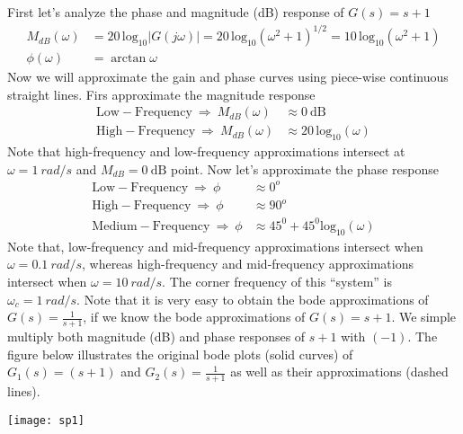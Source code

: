 \documentclass[twoside]{article}
\begin{document}
First let's analyze the phase and magnitude (dB) response of $G(s) = s + 1$
%
\begin{align*}
  M_{dB} (\omega) &= 20 \, \mathrm{log}_{10} | G( j \omega) | = 20 \, \mathrm{log}_{10} \left( \omega^2 + 1 \right)^{1/2} = 10 \, \mathrm{log}_{10} \left( \omega^2 + 1 \right)
  \\
  \phi(\omega) &= \arctan \omega                                    
\end{align*}
%
Now we will approximate the gain and phase curves using piece-wise continuous straight lines. 
Firs approximate the magnitude response
%
\begin{align*}
  \mathrm{Low-Frequency} \ \Rightarrow \ M_{dB}(\omega)  &\approx 0 \
                                                   \mathrm{dB} \\
  \mathrm{High-Frequency} \ \Rightarrow \ M_{dB}(\omega)  &\approx 20 \,
                                                    \mathrm{log}_{10} ( \omega )
\end{align*}
%
Note that high-frequency and low-frequency approximations intersect at
$\omega = 1 \ rad/s$ and $M_{dB} = 0 \ \mathrm{dB}$ point. Now 
let's approximate the phase response
%
\begin{align*}
  \mathrm{Low-Frequency} \ \Rightarrow \ \phi  &\approx 0^o  \\
  \mathrm{High-Frequency} \ \Rightarrow \ \phi &\approx 90^o \\
  \mathrm{Medium-Frequency} \ \Rightarrow \ \phi & \approx 45^0 + 45^0 \mathrm{log}_{10} ( \omega)
\end{align*}
%
Note that, low-frequency and mid-frequency approximations intersect when $\omega = 0.1 \ rad/s$,
whereas high-frequency and mid-frequency approximations intersect when $\omega = 10 \ rad/s$.
The corner frequency of this ``system'' is $\omega_c = 1 \ rad/s$. Note that it is very easy to obtain 
the bode approximations of $G(s) = \frac{1}{s+1}$, if we know the bode approximations of $G(s) = s+1$. We
simple multiply both magnitude (dB) and phase responses of $s+1$ with $(-1)$. The figure below
illustrates the original bode plots (solid curves) of $G_1(s) = (s+1)$ and $G_2(s) = \frac{1}{s+1}$ as well as
their approximations (dashed lines). 

\vspace{6 pt}

  \begin{minipage}[h]{1\linewidth}
    \begin{center}
      \texttt{[image: sp1]}
    \end{center}
  \end{minipage}
\end{document}
